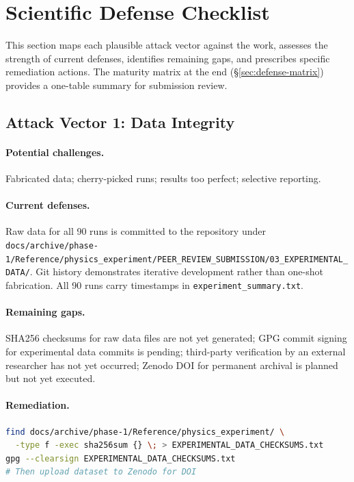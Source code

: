 
\section{Scientific Defense Checklist}
\label{sec:defense-checklist}

This section maps each plausible attack vector against the work, assesses
the strength of current defenses, identifies remaining gaps, and prescribes
specific remediation actions. The maturity matrix at the end
(\S\ref{sec:defense-matrix}) provides a one-table summary for submission
review.

\subsection{Attack Vector 1: Data Integrity}

\paragraph{Potential challenges.}
Fabricated data; cherry-picked runs; results too perfect; selective reporting.

\paragraph{Current defenses.}
Raw data for all 90 runs is committed to the repository under
\texttt{docs/archive/phase-1/Reference/physics\_experiment/PEER\_REVIEW\_SUBMISSION/03\_EXPERIMENTAL\_DATA/}.
Git history demonstrates iterative development rather than one-shot fabrication.
All 90 runs carry timestamps in \texttt{experiment\_summary.txt}.

\paragraph{Remaining gaps.}
SHA256 checksums for raw data files are not yet generated; GPG commit signing
for experimental data commits is pending; third-party verification by an
external researcher has not yet occurred; Zenodo DOI for permanent archival
is planned but not yet executed.

\paragraph{Remediation.}
\begin{lstlisting}[language=bash]
find docs/archive/phase-1/Reference/physics_experiment/ \
  -type f -exec sha256sum {} \; > EXPERIMENTAL_DATA_CHECKSUMS.txt
gpg --clearsign EXPERIMENTAL_DATA_CHECKSUMS.txt
# Then upload dataset to Zenodo for DOI
\end{lstlisting}

